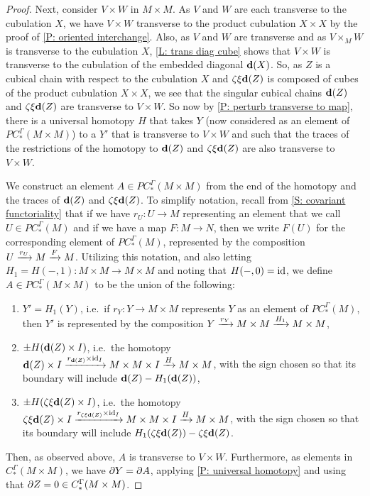 \documentclass{amsart}
\begin{document}
\begin{proof}
Next, consider $V\times W$ in $M\times M$. As $V$ and $W$ are each transverse to the cubulation $X$, we have $V\times W$ transverse to the product cubulation $X\times X$ by the proof of \cref{P: oriented interchange}. 
Also, as $V$ and $W$ are transverse and as $V\times_MW$ is transverse to the cubulation $X$, \cref{L: trans diag cube} shows that $V\times W$ is transverse to the cubulation of the embedded diagonal  $\mathbf{d}(X)$. So, as $Z$ is a cubical chain with respect to the cubulation $X$ and $\zeta\xi\mathbf{d}(Z)$ is composed of cubes of the product cubulation $X\times X$, we see that the singular cubical chains $\mathbf{d}(Z)$ and  $\zeta\xi\mathbf{d}(Z)$ are transverse to $V\times W$. So now by \cref{P: perturb transverse to map}, there is a universal homotopy $H$ that takes $Y$ (now considered as an element of $PC^\Gamma_*(M\times M)$) to a $Y'$ that is transverse to $V\times W$ and such that the traces of the restrictions of the homotopy to $\mathbf{d}(Z)$ and  $\zeta\xi\mathbf{d}(Z)$
are also transverse to  $V\times W$. 

We construct an element $A\in PC^\Gamma_*(M\times M)$ from the end of the homotopy and the traces of $\mathbf{d}(Z)$ and $\zeta\xi\mathbf{d}(Z)$. To simplify notation, recall from \cref{S: covariant functoriality} that if we have $r_U:U\to M$ representing an element that we call $U\in PC^\Gamma_*(M)$ and if we have a map $F:M\to N$, then we write $F(U)$ for the corresponding element of $PC^\Gamma_*(M)$, represented by the composition $U\xrightarrow{r_U}M\xrightarrow{F}M$.
Utilizing this notation, and also letting $H_1=H(-,1):M\times M\to M\times M$ and noting that $H(-,0)=\mathrm{id}$, we define $A\in PC^\Gamma_*(M\times M)$ to be the union of the following:
\begin{enumerate}
\item $Y'=H_1(Y)$, i.e.\ if $r_Y:Y\to M\times M$ represents $Y$ as an element of $PC^\Gamma_*(M)$, then $Y'$ is represented by  the composition $Y\xrightarrow{r_Y} M\times M\xrightarrow{H_1}M\times M$, 

\item $\pm H(\mathbf{d}(Z)\times I)$, i.e.\ the homotopy $\mathbf{d}(Z)\times I\xrightarrow{r_{\mathbf{d}(Z)}\times \mathrm{id}_I} M\times M\times I\xrightarrow{H}M\times M$, with the sign chosen so that its boundary will include $\mathbf{d}(Z)-H_1(\mathbf{d}(Z))$,

\item $\pm H(\zeta\xi\mathbf{d}(Z)\times I)$, i.e.\ the homotopy $\zeta\xi\mathbf{d}(Z)\times I\xrightarrow{r_{\zeta\xi\mathbf{d}(Z)}\times \mathrm{id}_I} M\times M\times I\xrightarrow{H}M\times M$, with the sign chosen so that its boundary will include $H_1(\zeta\xi\mathbf{d}(Z))-\zeta\xi\mathbf{d}(Z)$.
\end{enumerate}
Then, as observed above, $A$ is transverse to $V\times W$. Furthermore, as elements in $C_*^\Gamma(M\times M)$, we have $\partial Y=\partial A$, applying \cref{P: universal homotopy} and using that $\partial Z=0\in C_*^\Gamma(M\times M)$.




\end{proof}
\end{document}
